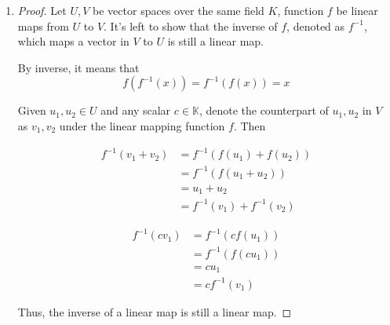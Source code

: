 \documentclass[paper=a4, fontsize=11pt]{scrartcl} %
\numberwithin{equation}{section} %
\numberwithin{figure}{section} %
\numberwithin{table}{section} %
\begin{document}
\begin{enumerate}
\begin{proof}
			Thus, the composition of two linear maps is still a linear map.
		\end{proof}
	
	\item
		\begin{proof}
			Let $U, V$ be vector spaces over the same field $K$, function $f$ be linear maps from $U$ to $V$. It's left to show that the inverse of $f$, denoted as $f^{-1}$, which maps a vector in $V$ to $U$ is still a linear map.
			
			By inverse, it means that
			\begin{equation}
				f(f^{-1}(x)) = f^{-1}(f(x)) = x
			\end{equation}
			
			Given $u_1, u_2 \in U$ and any scalar $c \in \mathbb{K}$, denote the counterpart of $u_1, u_2$ in $V$ as $v_1, v_2$ under the linear mapping function $f$. Then
			
			\begin{equation}
				\begin{aligned}
					f^{-1}(v_1 + v_2) & = f^{-1}(f(u_1) + f(u_2)) \\
									  & = f^{-1}(f(u_1 + u_2)) \\
									  & = u_1 + u_2 \\
									  & = f^{-1}(v_1) + f^{-1}(v_2)
				\end{aligned}
			\end{equation}
			
			\begin{equation}
				\begin{aligned}
					f^{-1}(c v_1) & = f^{-1}(c f(u_1)) \\
							      & = f^{-1}(f(c u_1)) \\
								  & = c u_1 \\
								  & = c f^{-1}(v_1)
				\end{aligned}
			\end{equation}
			
			Thus, the inverse of a linear map is still a linear map.
		\end{proof}
\end{enumerate}

\end{document}
